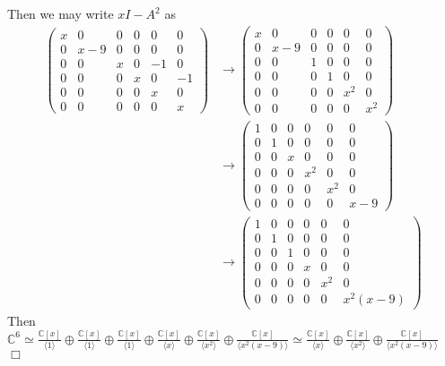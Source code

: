 \documentclass{article}
\begin{document}
Then we may write $xI - A^2$ as
\begin{equation*}
\begin{split}
\begin{pmatrix}
x & 0 & 0 & 0 & 0 & 0 \\ 0 & x - 9 & 0 & 0 & 0 & 0 \\ 0 & 0 & x & 0 & -1 & 0 \\ 0 & 0 & 0 & x & 0 & -1 \\ 0 & 0 & 0 & 0 & x & 0 \\ 0 & 0 & 0 & 0 & 0 & x
\end{pmatrix}
&\rightarrow
\begin{pmatrix}
x & 0 & 0 & 0 & 0 & 0 \\ 0 & x - 9 & 0 & 0 & 0 & 0 \\ 0 & 0 & 1 & 0 & 0 & 0 \\ 0 & 0 & 0 & 1 & 0 & 0 \\ 0 & 0 & 0 & 0 & x^2 & 0 \\ 0 & 0 & 0 & 0 & 0 & x^2
\end{pmatrix}\\
&\rightarrow
\begin{pmatrix}
1 & 0 & 0 & 0 & 0 & 0 \\ 0 & 1 & 0 & 0 & 0 & 0 \\ 0 & 0 & x & 0 & 0 & 0 \\ 0 & 0 & 0 & x^2 & 0 & 0 \\ 0 & 0 & 0 & 0 & x^2 & 0 \\ 0 & 0 & 0 & 0 & 0 & x-9
\end{pmatrix}\\
&\rightarrow
\begin{pmatrix}
1 & 0 & 0 & 0 & 0 & 0 \\ 0 & 1 & 0 & 0 & 0 & 0 \\ 0 & 0 & 1 & 0 & 0 & 0 \\ 0 & 0 & 0 & x & 0 & 0 \\ 0 & 0 & 0 & 0 & x^2 & 0 \\ 0 & 0 & 0 & 0 & 0 & x^2(x-9)
\end{pmatrix}
\end{split}
\end{equation*}
Then $\mathbb{C}^6 \simeq \frac{\mathbb{C}[x]}{\langle 1 \rangle} \oplus \frac{\mathbb{C}[x]}{\langle 1 \rangle} \oplus \frac{\mathbb{C}[x]}{\langle 1 \rangle} \oplus \frac{\mathbb{C}[x]}{\langle x \rangle} \oplus \frac{\mathbb{C}[x]}{\langle x^2 \rangle} \oplus \frac{\mathbb{C}[x]}{\langle x^2(x-9) \rangle} \simeq \frac{\mathbb{C}[x]}{\langle x \rangle} \oplus \frac{\mathbb{C}[x]}{\langle x^2 \rangle} \oplus \frac{\mathbb{C}[x]}{\langle x^2(x-9) \rangle}$ $\Box$
\end{document}

